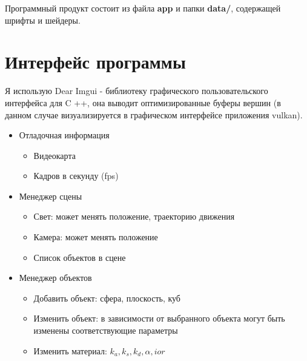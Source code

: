Программный продукт состоит из файла \textbf{app} и папки \textbf{data/}, содержащей шрифты и шейдеры.

\section{Интерфейс программы}

Я использую Dear Imgui - библиотеку графического пользовательского интерфейса для C ++,
она выводит оптимизированные буферы вершин (в данном случае визуализируется в графическом интерфейсе приложения vulkan).

\begin{itemize}
    \item Отладочная информация
    \begin{itemize}
        \item Видеокарта
        \item Кадров в секунду (fps)
    \end{itemize}
    \item Менеджер сцены
    \begin{itemize}
        \item Свет: может менять положение, траекторию движения
        \item Камера: может менять положение
        \item Список объектов в сцене
    \end{itemize}
    \item Менеджер объектов
    \begin{itemize}
        \item Добавить объект: сфера, плоскость, куб
        \item Изменить объект: в зависимости от выбранного объекта могут быть
    изменены соответствующие параметры
        \item Изменить материал: $k_a, k_s, k_d, \alpha, ior$
    \end{itemize}
\end{itemize}
